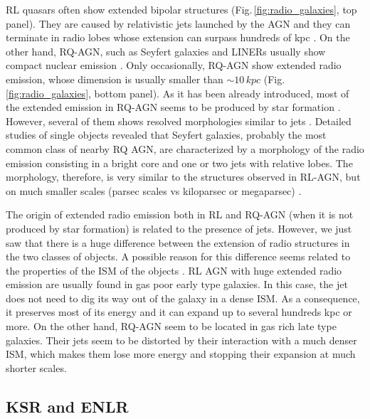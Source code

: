 \documentclass[../main.tex]{subfiles}
\begin{document}
RL quasars often show extended bipolar structures (Fig.\,\ref{fig:radio_galaxies}, top panel).
They are caused by relativistic jets launched by the AGN and they can terminate in radio lobes whose extension can surpass hundreds of kpc \citep[e.g][]{Fanaroff74,Perley79,Bridle94}.
On the other hand, RQ-AGN, such as Seyfert galaxies and LINERs usually show compact nuclear emission \citep{Singh15}.
Only occasionally, RQ-AGN show extended radio emission, whose dimension is usually smaller than $\sim 10\,\si{kpc}$ (Fig.\,\ref{fig:radio_galaxies}, bottom panel).
As it has been already introduced, most of the extended emission in RQ-AGN seems to be produced by star formation \citep{Baum93, Kellermann16}.
However, several of them shows resolved morphologies similar to jets \citep{Baum93,Colbert96,Morganti99,Gallimore06,Singh15, Singh15b}.
Detailed studies of single objects revealed that Seyfert galaxies, probably the most common class of nearby RQ AGN, are characterized by a morphology of the radio emission consisting in a bright core and one or two jets with relative lobes.
The morphology, therefore, is very similar to the structures observed in RL-AGN, but on much smaller scales (parsec scales vs kiloparsec or megaparsec) \citep[e.g.][]{Wrobel84,Ulvestad87,Morganti99,Kukula99,Momjian03,Kharb06}.

The origin of extended radio emission both in RL and RQ-AGN (when it is not produced by star formation) is related to the presence of jets.
However, we just saw that there is a huge difference between the extension of radio structures in the two classes of objects.
A possible reason for this difference seems related to the properties of the ISM of the objects \citep{Whittle04,Gallimore06,Schawinski11,Singh15b}.
RL AGN with huge extended radio emission are usually found in gas poor early type galaxies.
In this case, the jet does not need to dig its way out of the galaxy in a dense ISM.
As a consequence, it preserves most of its energy and it can expand up to several hundreds kpc or more.
On the other hand, RQ-AGN seem to be located in gas rich late type galaxies.
Their jets seem to be distorted by their interaction with a much denser ISM, which makes them lose more energy and stopping their expansion at much shorter scales.

\subsection{KSR and ENLR}
\end{document}
